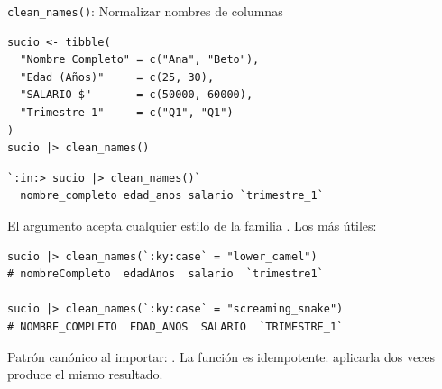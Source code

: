 \documentclass[8pt]{beamer}
\begin{document}
	\begin{frame}[fragile]{\texttt{clean\_names()}: Normalizar nombres de columnas}
\begin{lstlisting}[style=RScript]
sucio <- tibble(
  "Nombre Completo" = c("Ana", "Beto"),
  "Edad (Años)"     = c(25, 30),
  "SALARIO $"       = c(50000, 60000),
  "Trimestre 1"     = c("Q1", "Q1")
)
sucio |> clean_names()
\end{lstlisting}
\begin{lstlisting}[style=RConsole]
`:in:> sucio |> clean_names()`
  nombre_completo edad_anos salario `trimestre_1`
\end{lstlisting}

		El argumento  acepta cualquier estilo de la familia . Los más útiles:
\begin{lstlisting}[style=RScript]
sucio |> clean_names(`:ky:case` = "lower_camel")
# nombreCompleto  edadAnos  salario  `trimestre1`

sucio |> clean_names(`:ky:case` = "screaming_snake")
# NOMBRE_COMPLETO  EDAD_ANOS  SALARIO  `TRIMESTRE_1`
\end{lstlisting}

		\begin{block}{}
			Patrón canónico al importar: . La función es idempotente: aplicarla dos veces produce el mismo resultado.
		\end{block}
	\end{frame}
\end{document}
